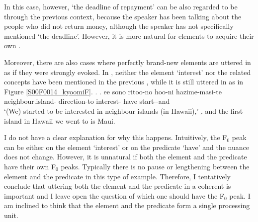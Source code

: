 In this case, however,
 `the deadline of repayment' can be also regarded to be  through the previous context,
because the speaker has been talking about the people who did not return money,
although the speaker has not specifically mentioned  `the deadline'.
However, it is more natural for  elements
to acquire their own .

Moreover,
there are also cases where perfectly brand-new elements are uttered in  as if they were strongly evoked.
In \Next,
neither the element  `interest' nor the related concepts have been mentioned in the previous ,
while it is still uttered in  as in Figure \ref{S00F0014_kyoomiF}.
%
\ex.\label{S00F0014_kyoomi}
 \ag. ee sono ritoo-no \tp{\dvline} hoo-ni  \tp{\dvline}  hazime-masi-te \tp{\dvline} \\
        neighbour.island- {} direction-to interest- {} have start--and {} \\
      `(We) started to be interested in neighbour islands (in Hawaii),'
 \b. and the first island in Hawaii we went to is Maui.

I do not have a clear explanation for why this happens.
Intuitively, the F$_{0}$ peak can be either on the element  `interest' or on the predicate  `have'
and the nuance does not change.
However, it is unnatural if both the element and the predicate have their own F$_{0}$ peaks.
Typically there is no pause or  lengthening between the element and the predicate in this type of example.
Therefore, I tentatively conclude that uttering both the element and the predicate in a coherent  is important and I leave open the question of which one should have the F$_{0}$ peak.
I am inclined to think that the element and the predicate form a single processing unit.

